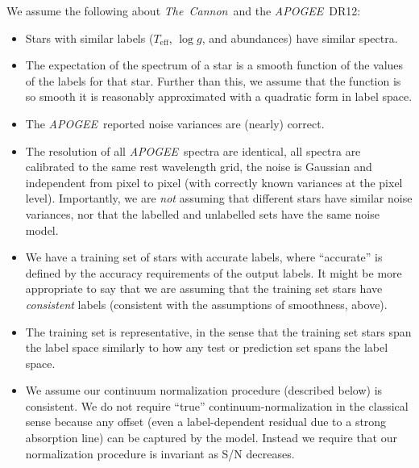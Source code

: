 \documentclass[12pt,preprint]{aastex}
\newcommand{\project}[1]{\textsl{#1}}
\newcommand{\TheCannon}{\project{The~Cannon}}
\newcommand{\acronym}[1]{{\small{#1}}}
\newcommand{\apogee}{\project{\acronym{APOGEE}}}
\newcommand{\dr}{\acronym{DR12}}
\newcommand{\logg}{\log g}
\newcommand{\Teff}{T_{\mathrm{eff}}}
\begin{document}
\noindent{}We assume the following about \TheCannon\ and the \apogee\ \dr:
\begin{itemize}
\item
Stars with similar labels ($\Teff$, $\logg$, and abundances) have similar spectra.
\item
The expectation of the spectrum of a star is a smooth function of the values of 
the labels for that star.  Further than this, we assume that the function is so 
smooth it is reasonably approximated with a quadratic form in label space.
\item
The \apogee\ reported noise variances are (nearly) correct.
\item
The resolution of all \apogee\ spectra are identical, all spectra are calibrated
to the same rest wavelength grid, the noise is Gaussian and independent from 
pixel to pixel (with correctly known variances at the pixel level).  
Importantly, we are \emph{not} assuming that different stars have similar noise
variances, nor that the labelled and unlabelled sets have the same noise model.
\item
We have a training set of stars with accurate labels, where ``accurate'' is 
defined by the accuracy requirements of the output labels.  It might be more 
appropriate to say that we are assuming that the training set stars have 
\emph{consistent} labels (consistent with the assumptions of smoothness, above).

\item
The training set is representative, in the sense that the training set stars 
span the label space similarly to how any test or prediction set spans the label
space.
\item
We assume our continuum normalization procedure (described below) is consistent.
We do not require ``true'' continuum-normalization in the classical sense 
because any offset (even a label-dependent residual due to a strong absorption
line) can be captured by the model.  Instead we require that our normalization
procedure is invariant as S/N decreases.
\end{itemize}
\end{document}
